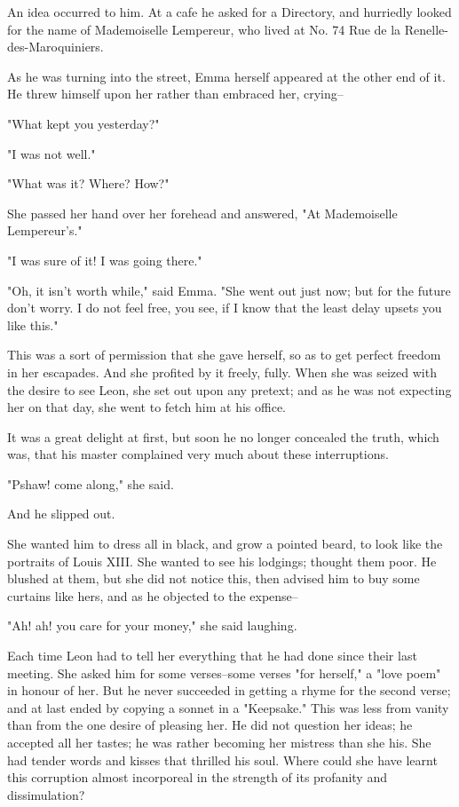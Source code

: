 \documentclass{tufte-book}
\begin{document}
An idea occurred to him. At a cafe he asked for a Directory, and
hurriedly looked for the name of Mademoiselle Lempereur, who lived at
No. 74 Rue de la Renelle-des-Maroquiniers.

As he was turning into the street, Emma herself appeared at the other
end of it. He threw himself upon her rather than embraced her, crying--

"What kept you yesterday?"

"I was not well."

"What was it? Where? How?"

She passed her hand over her forehead and answered, "At Mademoiselle
Lempereur's."

"I was sure of it! I was going there."

"Oh, it isn't worth while," said Emma. "She went out just now; but for
the future don't worry. I do not feel free, you see, if I know that the
least delay upsets you like this."

This was a sort of permission that she gave herself, so as to get
perfect freedom in her escapades. And she profited by it freely, fully.
When she was seized with the desire to see Leon, she set out upon any
pretext; and as he was not expecting her on that day, she went to fetch
him at his office.

It was a great delight at first, but soon he no longer concealed the
truth, which was, that his master complained very much about these
interruptions.

"Pshaw! come along," she said.

And he slipped out.

She wanted him to dress all in black, and grow a pointed beard, to
look like the portraits of Louis XIII. She wanted to see his lodgings;
thought them poor. He blushed at them, but she did not notice this, then
advised him to buy some curtains like hers, and as he objected to the
expense--

"Ah! ah! you care for your money," she said laughing.

Each time Leon had to tell her everything that he had done since their
last meeting. She asked him for some verses--some verses "for herself,"
a "love poem" in honour of her. But he never succeeded in getting a
rhyme for the second verse; and at last ended by copying a sonnet in
a "Keepsake." This was less from vanity than from the one desire of
pleasing her. He did not question her ideas; he accepted all her tastes;
he was rather becoming her mistress than she his. She had tender words
and kisses that thrilled his soul. Where could she have learnt this
corruption almost incorporeal in the strength of its profanity and
dissimulation?
\end{document}
